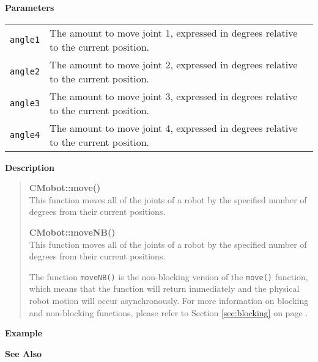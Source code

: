 \noindent
{\bf Parameters}\\
\vspace{-0.1in}
\begin{description}
\item               
\begin{tabular}{p{15 mm}p{105 mm}}
\texttt{angle1} & The amount to move joint 1, expressed in degrees relative to the current position. \\
\texttt{angle2} & The amount to move joint 2, expressed in degrees relative to the current position. \\
\texttt{angle3} & The amount to move joint 3, expressed in degrees relative to the current position. \\
\texttt{angle4} & The amount to move joint 4, expressed in degrees relative to the current position. \\
\end{tabular}
\end{description}
\noindent
{\bf Description}\\
\vspace{-12pt}
\begin{quote}
{\bf CMobot::move()}\\
This function moves all of the joints of a robot by the specified number of degrees
from their current positions. 

{\bf CMobot::moveNB()}\\
This function moves all of the joints of a robot by the specified number of degrees
from their current positions. 

The function \texttt{moveNB()} is the non-blocking version of
the \texttt{move()} function, which means that the function will return
immediately and the physical robot motion will occur asynchronously. For 
more information on blocking and non-blocking functions, please refer to 
Section \ref{sec:blocking} on page \pageref{sec:blocking}.\\
\end{quote}

\noindent
{\bf Example}\\
\noindent

\noindent
{\bf See Also}\\

